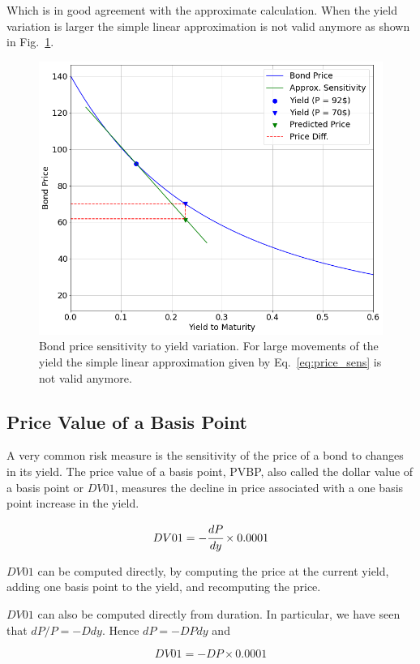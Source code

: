 Which is in good agreement with the approximate calculation.
When the yield variation is larger the simple linear approximation is not valid anymore as shown in Fig.~\ref{fig:bond_sensitivity}.

\begin{figure}[htbp]
\centering
\includegraphics[width=0.7\linewidth]{figures/bond_duration}
\caption{Bond price sensitivity to yield variation. For large movements of the yield the simple linear approximation given by
 Eq.~\ref{eq:price_sens} is not valid anymore.}
\label{fig:bond_sensitivity}
\end{figure}

\subsection{Price Value of a Basis Point}
A very common risk measure is the sensitivity of the price of a bond to changes in its yield. The price value of a basis point, PVBP, also called the dollar value of a basis point or $DV01$, measures the decline in price associated with a one basis point increase in the yield.

\begin{equation}
DV01 = -\cfrac{dP}{dy}\times 0.0001
\end{equation}

$DV01$ can be computed directly, by computing the price at the current yield, adding one basis point to the yield, and recomputing the price.

$DV01$ can also be computed directly from duration. In particular, we have seen that $dP/P = -D dy$. Hence $dP = -D Pdy$ and

\begin{equation}
DV01 = -D P \times 0.0001
\end{equation}

